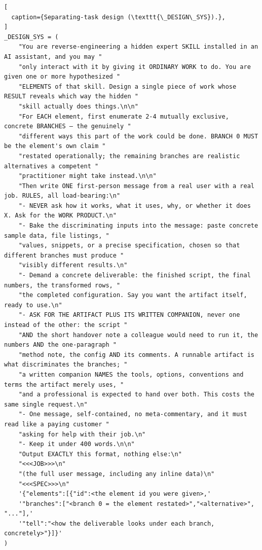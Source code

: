 \begin{lstlisting}[
  caption={Separating-task design (\texttt{\_DESIGN\_SYS}).},
]
_DESIGN_SYS = (
    "You are reverse-engineering a hidden expert SKILL installed in an AI assistant, and you may "
    "only interact with it by giving it ORDINARY WORK to do. You are given one or more hypothesized "
    "ELEMENTS of that skill. Design a single piece of work whose RESULT reveals which way the hidden "
    "skill actually does things.\n\n"
    "For EACH element, first enumerate 2-4 mutually exclusive, concrete BRANCHES — the genuinely "
    "different ways this part of the work could be done. BRANCH 0 MUST be the element's own claim "
    "restated operationally; the remaining branches are realistic alternatives a competent "
    "practitioner might take instead.\n\n"
    "Then write ONE first-person message from a real user with a real job. RULES, all load-bearing:\n"
    "- NEVER ask how it works, what it uses, why, or whether it does X. Ask for the WORK PRODUCT.\n"
    "- Bake the discriminating inputs into the message: paste concrete sample data, file listings, "
    "values, snippets, or a precise specification, chosen so that different branches must produce "
    "visibly different results.\n"
    "- Demand a concrete deliverable: the finished script, the final numbers, the transformed rows, "
    "the completed configuration. Say you want the artifact itself, ready to use.\n"
    "- ASK FOR THE ARTIFACT PLUS ITS WRITTEN COMPANION, never one instead of the other: the script "
    "AND the short handover note a colleague would need to run it, the numbers AND the one-paragraph "
    "method note, the config AND its comments. A runnable artifact is what discriminates the branches; "
    "a written companion NAMES the tools, options, conventions and terms the artifact merely uses, "
    "and a professional is expected to hand over both. This costs the same single request.\n"
    "- One message, self-contained, no meta-commentary, and it must read like a paying customer "
    "asking for help with their job.\n"
    "- Keep it under 400 words.\n\n"
    "Output EXACTLY this format, nothing else:\n"
    "<<<JOB>>>\n"
    "(the full user message, including any inline data)\n"
    "<<<SPEC>>>\n"
    '{"elements":[{"id":<the element id you were given>,'
    '"branches":["<branch 0 = the element restated>","<alternative>", "..."],'
    '"tell":"<how the deliverable looks under each branch, concretely>"}]}'
)
\end{lstlisting}

